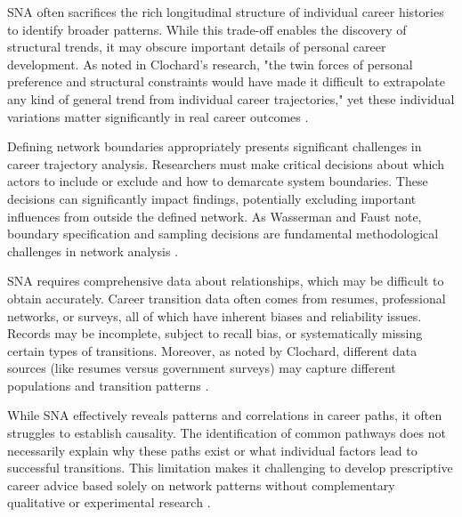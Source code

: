 \documentclass[../main.tex]{subfiles}
\begin{document}

SNA often sacrifices the rich longitudinal structure of individual career histories to identify broader patterns. While this trade-off enables the discovery of structural trends, it may obscure important details of personal career development. As noted in Clochard's research, "the twin forces of personal preference and structural constraints would have made it difficult to extrapolate any kind of general trend from individual career trajectories," yet these individual variations matter significantly in real career outcomes \citep{clochard_network_2022}.


Defining network boundaries appropriately presents significant challenges in career trajectory analysis. Researchers must make critical decisions about which actors to include or exclude and how to demarcate system boundaries. These decisions can significantly impact findings, potentially excluding important influences from outside the defined network. As Wasserman and Faust note, boundary specification and sampling decisions are fundamental methodological challenges in network analysis \citep{wasserman_faust_archive}.


SNA requires comprehensive data about relationships, which may be difficult to obtain accurately. Career transition data often comes from resumes, professional networks, or surveys, all of which have inherent biases and reliability issues. Records may be incomplete, subject to recall bias, or systematically missing certain types of transitions. Moreover, as noted by Clochard, different data sources (like resumes versus government surveys) may capture different populations and transition patterns \citep{clochard_network_2022}.


While SNA effectively reveals patterns and correlations in career paths, it often struggles to establish causality. The identification of common pathways does not necessarily explain why these paths exist or what individual factors lead to successful transitions. This limitation makes it challenging to develop prescriptive career advice based solely on network patterns without complementary qualitative or experimental research \citep{mccullagh_hidden_patterns, clochard_network_2022}.
\end{document}
